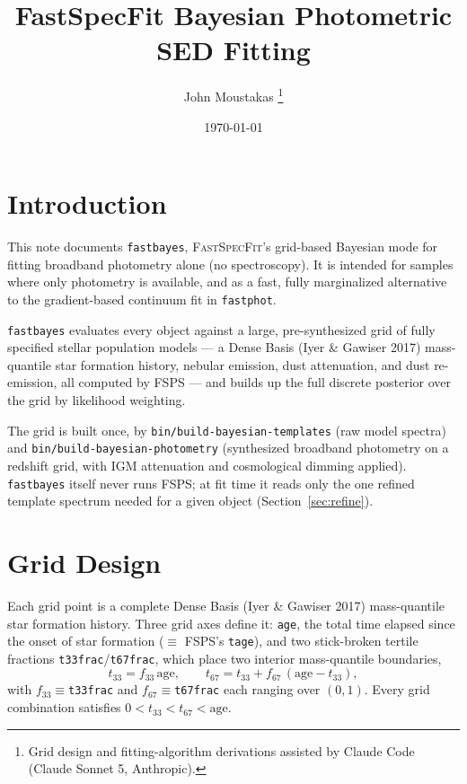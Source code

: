 \documentclass[12pt]{article}
\title{FastSpecFit Bayesian Photometric SED Fitting}
\author{John Moustakas%
  \thanks{Grid design and fitting-algorithm derivations assisted by
    Claude Code (Claude Sonnet 5, Anthropic).}}
\date{\today}
\begin{document}
\maketitle

\section{Introduction}
\label{sec:intro}

This note documents \texttt{fastbayes}, \textsc{FastSpecFit}'s grid-based
Bayesian mode for fitting broadband photometry alone (no spectroscopy). It
is intended for samples where only photometry is available, and as a fast,
fully marginalized alternative to the gradient-based continuum fit in
\texttt{fastphot}.

\texttt{fastbayes} evaluates every object against a large, pre-synthesized
grid of fully specified stellar population models --- a Dense Basis (Iyer
\& Gawiser 2017) mass-quantile star formation history, nebular emission,
dust attenuation, and dust re-emission, all computed by FSPS --- and builds
up the full discrete posterior over the grid by likelihood weighting.

The grid is built once, by \texttt{bin/build-bayesian-templates} (raw
model spectra) and \texttt{bin/build-bayesian-photometry} (synthesized
broadband photometry on a redshift grid, with IGM attenuation and
cosmological dimming applied). \texttt{fastbayes} itself never runs FSPS;
at fit time it reads only the one refined template spectrum needed for a
given object (Section~\ref{sec:refine}).

\section{Grid Design}
\label{sec:grid}

Each grid point is a complete Dense Basis (Iyer \& Gawiser 2017)
mass-quantile star formation history. Three grid axes define it:
\texttt{age}, the total time elapsed since the onset of star formation
($\equiv$ FSPS's \texttt{tage}), and two stick-broken tertile fractions
\texttt{t33frac}/\texttt{t67frac}, which place two interior mass-quantile
boundaries,
\begin{equation}
  t_{33} = f_{33}\,\mathrm{age}, \qquad
  t_{67} = t_{33} + f_{67}\,(\mathrm{age} - t_{33}),
  \label{eq:tertiles}
\end{equation}
with $f_{33}\equiv$\texttt{t33frac} and $f_{67}\equiv$\texttt{t67frac} each
ranging over $(0,1)$. Every grid combination satisfies
$0 < t_{33} < t_{67} < \mathrm{age}$.
\end{document}
